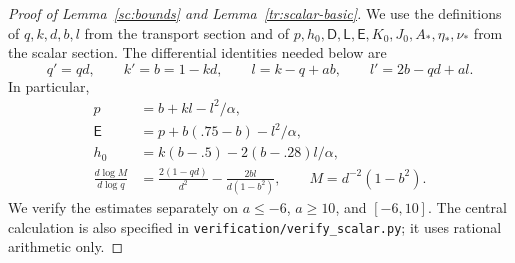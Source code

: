 \begin{proof}[Proof of Lemma~\ref{sc:bounds} and Lemma~\ref{tr:scalar-basic}]
We use the definitions of $q,k,d,b,l$ from the transport section and of
$p,h_0,\mathsf D,\mathsf L,\mathsf E,K_0,J_0,A_*,\eta_*,\nu_*$
from the scalar section. The differential identities needed below are
\begin{equation}\label{cert:identities}
 q'=qd,\qquad k'=b=1-kd,\qquad
 l=k-q+ab,\qquad l'=2b-qd+al.
\end{equation}
In particular,
\begin{equation}\label{cert:derived}
 \begin{split}
 p&=b+kl-l^2/\alpha,\\
 \mathsf E&=p+b(.75-b)-l^2/\alpha,\\
 h_0&=k(b-.5)-2(b-.28)l/\alpha,\\
 \frac{d\log M}{d\log q}
 &=\frac{2(1-qd)}{d^2}
       -\frac{2bl}{d(1-b^2)},\qquad M=d^{-2}(1-b^2).
 \end{split}
\end{equation}
We verify the estimates separately on $a\le-6$, $a\ge10$, and
$[-6,10]$. The central calculation is also specified in
\texttt{verification/verify\_scalar.py}; it uses rational arithmetic only.


\end{proof}
